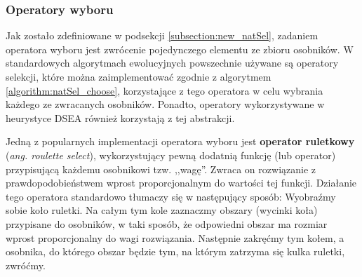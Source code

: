 \documentclass[twoside]{iisthesis}
\begin{document}
\subsubsection{Operatory wyboru}

Jak zostało zdefiniowane w podsekcji \ref{subsection:new_natSel}, zadaniem operatora wyboru jest zwrócenie pojedynczego elementu ze zbioru osobników.
W standardowych algorytmach ewolucyjnych powszechnie używane są operatory selekcji, które można zaimplementować zgodnie z algorytmem \ref{algorithm:natSel_choose}, korzystające z tego operatora w celu wybrania każdego ze zwracanych osobników.
Ponadto, operatory wykorzystywane w heurystyce DSEA również korzystają z tej abstrakcji.

Jedną z popularnych implementacji operatora wyboru jest \textbf{operator ruletkowy} (\emph{ang. roulette select}), wykorzystujący pewną dodatnią funkcję (lub operator) przypisującą każdemu osobnikowi tzw. ,,wagę''.
Zwraca on rozwiązanie z prawdopodobieństwem wprost proporcjonalnym do wartości tej funkcji.
Działanie tego operatora standardowo tłumaczy się w następujący sposób:
Wyobraźmy sobie koło ruletki. 
Na całym tym kole zaznaczmy obszary (wycinki koła) przypisane do osobników, w taki sposób, że odpowiedni obszar ma rozmiar wprost proporcjonalny do wagi rozwiązania. 
Następnie zakręćmy tym kołem, a osobnika, do którego obszar będzie tym, na którym zatrzyma się kulka ruletki, zwróćmy.
\end{document}
